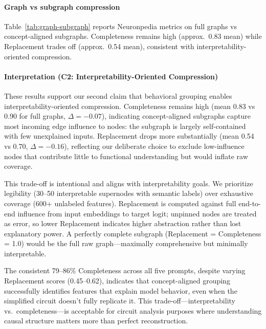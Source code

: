 \paragraph{Graph vs subgraph compression}
Table~\ref{tab:graph-subgraph} reports Neuronpedia metrics on full graphs vs concept-aligned subgraphs. Completeness remains high (approx.\ 0.83 mean) while Replacement trades off (approx.\ 0.54 mean), consistent with interpretability-oriented compression.


\paragraph{Interpretation (C2: Interpretability-Oriented Compression)}
These results support our second claim that behavioral grouping enables interpretability-oriented compression. Completeness remains high (mean 0.83 vs 0.90 for full graphs, $\Delta = -0.07$), indicating concept-aligned subgraphs capture most incoming edge influence to nodes: the subgraph is largely self-contained with few unexplained inputs. Replacement drops more substantially (mean 0.54 vs 0.70, $\Delta = -0.16$), reflecting our deliberate choice to exclude low-influence nodes that contribute little to functional understanding but would inflate raw coverage.

This trade-off is intentional and aligns with interpretability goals. We prioritize legibility (30--50 interpretable supernodes with semantic labels) over exhaustive coverage (600+ unlabeled features). Replacement is computed against full end-to-end influence from input embeddings to target logit; unpinned nodes are treated as error, so lower Replacement indicates higher abstraction rather than lost explanatory power. A perfectly complete subgraph (Replacement = Completeness = 1.0) would be the full raw graph---maximally comprehensive but minimally interpretable.

The consistent 79--86\% Completeness across all five prompts, despite varying Replacement scores (0.45--0.62), indicates that concept-aligned grouping successfully identifies features that explain model behavior, even when the simplified circuit doesn't fully replicate it. This trade-off---interpretability vs.\ completeness---is acceptable for circuit analysis purposes where understanding causal structure matters more than perfect reconstruction.

